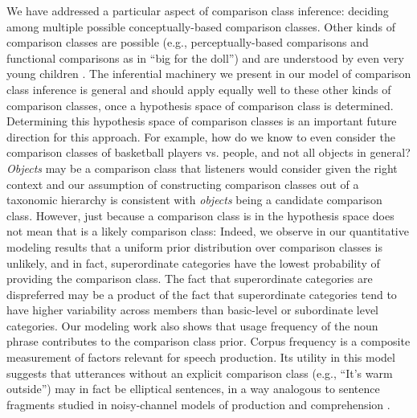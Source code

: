 \documentclass[doc]{apa6}
\begin{document}

We have addressed a particular aspect of comparison class inference: deciding among multiple possible conceptually-based comparison classes.
Other kinds of comparison classes are possible (e.g., perceptually-based comparisons and functional comparisons as in ``big for the doll'') and are understood by even very young children \cite{Ebeling1994}.
The inferential machinery we present in our model of comparison class inference is general and should apply equally well to these other kinds of comparison classes, once a hypothesis space of comparison class is determined.
Determining this hypothesis space of comparison classes is an important future direction for this approach.
For example, how do we know to even consider the comparison classes of basketball players vs. people, and not all objects in general?
\emph{Objects} may be a comparison class that listeners would consider given the right context and our assumption of constructing comparison classes out of a taxonomic hierarchy is consistent with \emph{objects} being a candidate comparison class.
However, just because a comparison class is in the hypothesis space does not mean that is a likely comparison class: Indeed, we observe in our quantitative modeling results that a uniform prior distribution over comparison classes is unlikely, and in fact, superordinate categories have the lowest probability of providing the comparison class.
The fact that superordinate categories are dispreferred may be a product of the fact that superordinate categories tend to have higher variability across members than basic-level or subordinate level categories.
Our modeling work also shows that usage frequency of the noun phrase contributes to the comparison class prior.
Corpus frequency is a composite measurement of factors relevant for speech production.
Its utility in this model suggests that utterances without an explicit comparison class (e.g., ``It's warm outside'') may in fact be elliptical sentences, in a way analogous to sentence fragments studied in noisy-channel models of production and comprehension \cite{bergen2015strategic}.
\end{document}
